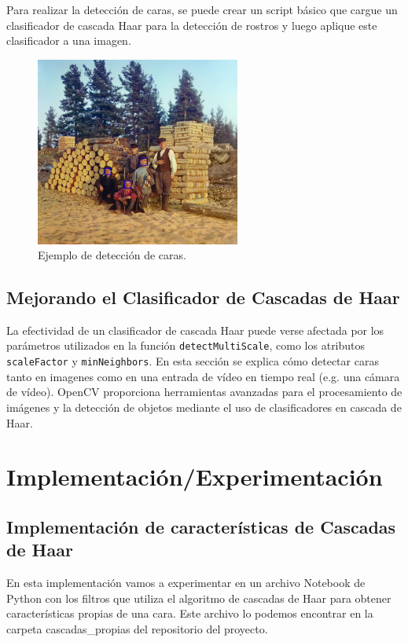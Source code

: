 \documentclass[a4paper]{article}
\begin{document}
Para realizar la detección de caras, se puede crear un script básico que cargue un clasificador de cascada Haar para la detección de rostros y luego aplique este clasificador a una imagen. 

\begin{figure}[h!]
    \centering
    \includegraphics[width=0.6\textwidth]{../img/woodcutters_face_detection.jpg}
    \caption{Ejemplo de detección de caras.}
\end{figure}

\subsection{Mejorando el Clasificador de Cascadas de Haar}

La efectividad de un clasificador de cascada Haar puede verse afectada por los parámetros utilizados en la función \texttt{detectMultiScale}, como los atributos \texttt{scaleFactor} y \texttt{minNeighbors}.
En esta sección se explica cómo detectar caras tanto en imagenes como en una entrada de vídeo en tiempo real (e.g. una cámara de vídeo).
OpenCV proporciona herramientas avanzadas para el procesamiento de imágenes y la detección de objetos mediante el uso de clasificadores en cascada de Haar.\newline

\section{Implementación/Experimentación}

\subsection{Implementación de características de Cascadas de Haar}

En esta implementación vamos a experimentar en un archivo Notebook de Python con los filtros que utiliza el algoritmo de cascadas de Haar para obtener características propias de una cara. Este archivo lo podemos encontrar en la carpeta cascadas\_propias del repositorio del proyecto.
\end{document}

